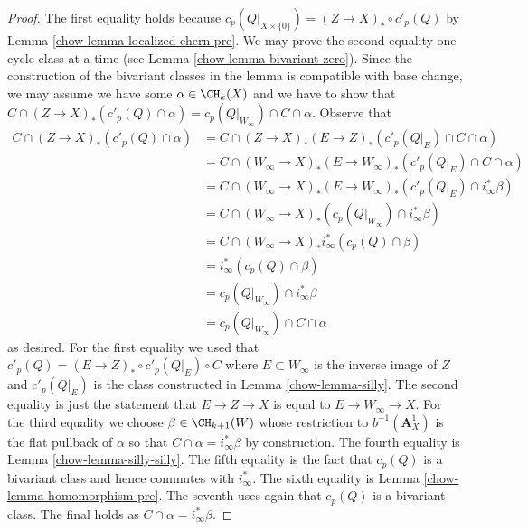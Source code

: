 \begin{proof}

The first equality holds because $c_p(Q|_{X \times \{0\}}) =
(Z \to X)_* \circ c'_p(Q)$ by Lemma \ref{chow-lemma-localized-chern-pre}.
We may prove the second equality one cycle class at a time
(see Lemma \ref{chow-lemma-bivariant-zero}). Since the construction of
the bivariant classes in the lemma is compatible with base change,
we may assume we have some $\alpha \in \CH_k(X)$ and we have to show that
$C \cap (Z \to X)_*(c'_p(Q) \cap \alpha) =
c_p(Q|_{W_\infty}) \cap C \cap \alpha$. Observe that
\begin{align*}
C \cap (Z \to X)_*(c'_p(Q) \cap \alpha)
& =
C \cap (Z \to X)_* (E \to Z)_*(c'_p(Q|_E) \cap C \cap \alpha) \\
& =
C \cap (W_\infty \to X)_*(E \to W_\infty)_*(c'_p(Q|_E) \cap C \cap \alpha) \\
& =
C \cap (W_\infty \to X)_*(E \to W_\infty)_*(c'_p(Q|_E) \cap i_\infty^*\beta) \\
& =
C \cap (W_\infty \to X)_*(c_p(Q|_{W_\infty}) \cap i_\infty^*\beta) \\
& =
C \cap (W_\infty \to X)_*i_\infty^*(c_p(Q) \cap \beta) \\
& =
i_\infty^*(c_p(Q) \cap \beta) \\
& =
c_p(Q|_{W_\infty}) \cap i_\infty^*\beta \\
& =
c_p(Q|_{W_\infty}) \cap C \cap \alpha
\end{align*}
as desired. For the first equality we used that
$c'_p(Q) = (E \to Z)_* \circ c'_p(Q|_E) \circ C$ where $E \subset W_\infty$
is the inverse image of $Z$ and $c'_p(Q|_E)$ is the class constructed
in Lemma \ref{chow-lemma-silly}. The second equality is just the statement
that $E \to Z \to X$ is equal to $E \to W_\infty \to X$.
For the third equality we choose $\beta \in \CH_{k + 1}(W)$ whose restriction to
$b^{-1}(\mathbf{A}^1_X)$ is the flat pullback of $\alpha$ so that
$C \cap \alpha = i_\infty^*\beta$ by construction. The fourth equality is
Lemma \ref{chow-lemma-silly-silly}. The fifth equality is the fact that
$c_p(Q)$ is a bivariant class and hence commutes with $i_\infty^*$.
The sixth equality is Lemma \ref{chow-lemma-homomorphism-pre}.
The seventh uses again that $c_p(Q)$ is a bivariant class.
The final holds as $C \cap \alpha = i_\infty^*\beta$.
\end{proof}

